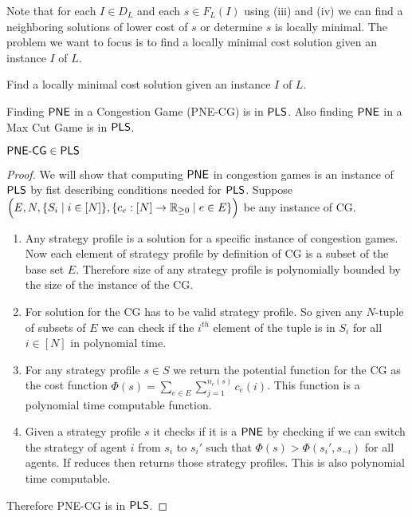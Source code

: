 Note that for each $I\in D_L$ and each $s\in F_L(I)$ using (iii) and (iv) we can find a neighboring solutions of lower cost of $s$ or determine $s$ is locally minimal. The problem we want to focus is to find a locally minimal cost solution given an instance $I$ of $L$.

\begin{goal}
	Find a locally minimal cost solution given an instance $I$ of $L$.
\end{goal}
Finding $\operatorname{\mathsf{PNE}}$ in a Congestion Game (\textsf{PNE-CG}) is in $\operatorname{\mathsf{PLS}}$. Also finding $\operatorname{\mathsf{PNE}} $  in a Max Cut Game is in $\operatorname{\mathsf{PLS}}$.
\begin{lemma}{}{}
	$\textsf{PNE-CG}\in \operatorname{\mathsf{PLS}}$
\end{lemma}
\begin{proof}
	We will show that computing $\operatorname{\mathsf{PNE}}$ in congestion games is an instance of $\operatorname{\mathsf{PLS}}$ by fist describing conditions needed for $\operatorname{\mathsf{PLS}}$. Suppose $\Big(E,N, \{S_i\mid i\in[N]\}, \{c_e:[N]\to \mathbb{R}_{\geq 0}\mid e\in E\}\Big)$ be any instance of CG.
	\begin{enumerate}[label=(\roman*)]
		\item Any strategy profile is a solution for a specific instance of congestion games. Now each element of strategy profile by definition of CG is a subset of the base set $E$. Therefore size of any strategy profile is polynomially bounded by the size of the instance of the CG.
		\item For solution for the CG has to be valid strategy profile. So given any $N$-tuple of subsets of $E$ we can check if the $i^{th}$ element of the tuple is in $S_i$ for all $i\in[N]$ in polynomial time.
		\item For any strategy profile $s\in S$ we return the potential function for the CG as the cost function $\Phi(s)=\sum\limits_{e\in E}\sum\limits_{j=1}^{n_e(s)}c_e(i)$. This function is a polynomial time computable function.
		\item Given a strategy profile $s$ it checks if it is a $\operatorname{\mathsf{PNE}}$ by checking if we can switch the strategy of agent $i$ from $s_i$ to $s_i'$ such that $\Phi(s)>\Phi(s_i',s_{-i})$ for all agents.  If reduces then returns those strategy profiles. This is also polynomial time computable.
	\end{enumerate}
Therefore \textsf{PNE-CG} is in $\operatorname{\mathsf{PLS}}$.
\end{proof}
